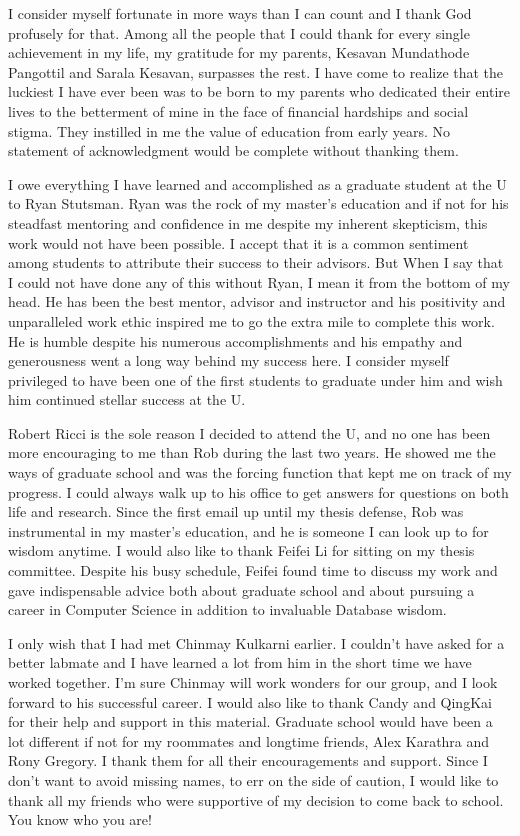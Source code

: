 I consider myself fortunate in more ways than I can count and I thank God profusely for that. Among all the people that I could thank for every single achievement in my life, my gratitude for my parents, Kesavan Mundathode Pangottil
and Sarala Kesavan, surpasses the rest. I have come to realize that the luckiest I have ever been was to be born to my parents who dedicated their entire lives to the betterment of mine in the face of financial hardships and social stigma. They instilled in me the value of education from early years. No statement of acknowledgment would be complete without thanking them.

I owe everything I have learned and accomplished as a graduate student at the U to Ryan Stutsman. Ryan was the rock of my master's education and if not for his steadfast mentoring and confidence in me despite my inherent skepticism, this work would not have been possible.
I accept that it is a common sentiment among students to attribute their success to their advisors. But When I say that I could not have done any of this without Ryan, I mean it from the bottom of my head. He has been the best mentor, advisor and instructor and his positivity and unparalleled work ethic inspired me to go the extra mile to complete this work.
He is humble despite his numerous accomplishments and his empathy and generousness went a long way behind my success here. I consider myself privileged to have been one of the first students to graduate under him and wish him continued stellar success at the U.

Robert Ricci is the sole reason I decided to attend the U, and no one has been more encouraging to me than Rob during the last two years. He showed me the ways of graduate school and
was the forcing function that kept me on track of my progress. I could always walk up to his office to get answers for questions on both life and research. Since the first email up until my thesis defense, Rob was instrumental in my master's education, and he is someone I can look up to for wisdom anytime.
I would also like to thank Feifei Li for sitting on my thesis committee. Despite his busy schedule, Feifei found time to discuss my work and gave indispensable advice both about graduate school and about pursuing a career in Computer Science in addition to invaluable Database wisdom.

I only wish that I had met Chinmay Kulkarni earlier. I couldn't have asked for a better labmate and I have learned a lot from him in the short time we have worked together.
I'm sure Chinmay will work wonders for our group, and I look forward to his successful career. I would also like to thank Candy and QingKai for their help and support in this material.
Graduate school would have been a lot different if not for my roommates and longtime friends, Alex Karathra and Rony Gregory. I thank them for all their encouragements and support.
Since I don't want to avoid missing names, to err on the side of caution, I would like to thank all my friends who were supportive of my decision to come back to school. You know who you are!

